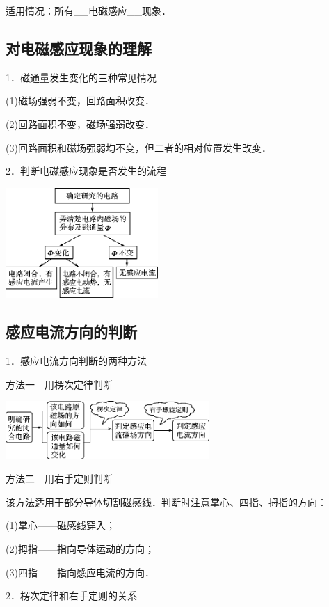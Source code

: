 \documentclass[cn,10.5pt,chinese,mac,chinesefont=founder]{elegantbook}
\begin{document}
适用情况：所有\_\_电磁感应\_\_现象．
\newpage
\subsection{对电磁感应现象的理解}

1．磁通量发生变化的三种常见情况

(1)磁场强弱不变，回路面积改变．

(2)回路面积不变，磁场强弱改变．

(3)回路面积和磁场强弱均不变，但二者的相对位置发生改变．

2．判断电磁感应现象是否发生的流程

\begin{center}\includegraphics[width=2.28333in,height=1.65069in]{media/image387.png}\end{center}

\newpage
\subsection{感应电流方向的判断}

1．感应电流方向判断的两种方法

方法一　用楞次定律判断

\begin{center}\includegraphics[width=3.05694in,height=0.86806in]{media/image389.png}\end{center}

方法二　用右手定则判断

该方法适用于部分导体切割磁感线．判断时注意掌心、四指、拇指的方向：

(1)掌心------磁感线穿入；

(2)拇指------指向导体运动的方向；

(3)四指------指向感应电流的方向．

2．楞次定律和右手定则的关系
\end{document}
